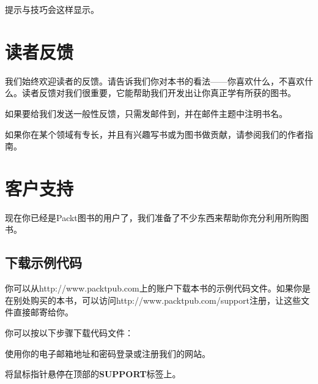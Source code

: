 
\begin{myNote}[tip]
提示与技巧会这样显示。
\end{myNote}



\section*{读者反馈}



我们始终欢迎读者的反馈。请告诉我们你对本书的看法——你喜欢什么，不喜欢什么。读者反馈对我们很重要，它能帮助我们开发出让你真正学有所获的图书。



如果要给我们发送一般性反馈，只需发邮件到，并在邮件主题中注明书名。



如果你在某个领域有专长，并且有兴趣写书或为图书做贡献，请参阅我们的作者指南。



\section*{客户支持}



现在你已经是Packt图书的用户了，我们准备了不少东西来帮助你充分利用所购图书。



\subsection*{下载示例代码}



你可以从http://\allowbreak{}www.\allowbreak{}packtpub.\allowbreak{}com上的账户下载本书的示例代码文件。如果你是在别处购买的本书，可以访问http://\allowbreak{}www.\allowbreak{}packtpub.\allowbreak{}com/\allowbreak{}support注册，让这些文件直接邮寄给你。



你可以按以下步骤下载代码文件：



使用你的电子邮箱地址和密码登录或注册我们的网站。



将鼠标指针悬停在顶部的\textbf{SUPPORT}标签上。


